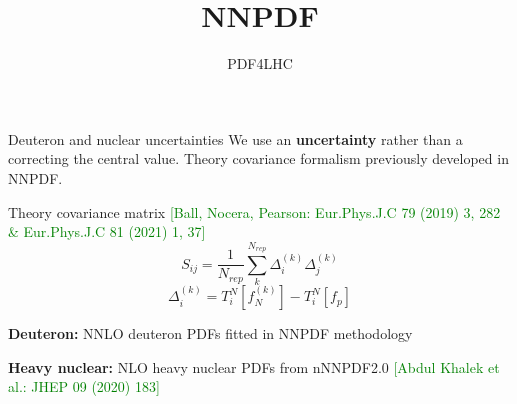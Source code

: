 \title{NNPDF}
\author[Rosalyn Pearson]{}
\date{PDF4LHC}


\begin{frame}[fragile]{Deuteron and nuclear uncertainties}
We use an {\bf uncertainty} rather than a correcting the central value.
\newline
Theory covariance formalism previously developed in NNPDF.
      \begin{block}{Theory covariance matrix \tiny{ \textcolor{green}{[Ball, Nocera, Pearson: Eur.Phys.J.C 79 (2019) 3, 282 \& Eur.Phys.J.C 81 (2021) 1, 37]}}}
        \begin{equation}
            S_{ij} = \frac{1}{N_{rep}} \sum_k^{N_{rep}} \Delta_i^{(k)}\Delta_j^{(k)}
        \end{equation}
        \begin{equation}
            \Delta_i^{(k)} = T_i^{N}[f_{N}^{(k)}] - T_i^{N}[f_{p}]
        \end{equation}
      \end{block}
      
    \textbf{Deuteron:} NNLO deuteron PDFs fitted in NNPDF methodology 
    
    \textbf{Heavy nuclear:} NLO heavy nuclear PDFs from nNNPDF2.0 \tiny{ \textcolor{green}{[Abdul Khalek et al.: JHEP 09 (2020) 183]}}
  \begin{table}
    \caption{$\chi^2$ per deuteron/nuclear dataset}
  \end{table}
\end{frame}

